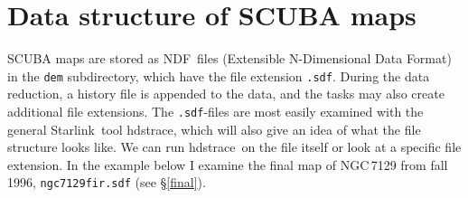 \documentclass[twoside,11pt]{article}
\newcommand{\starlink}{\htmladdnormallink{Starlink}{http://star-www.rl.ac.uk/}}
\newcommand{\ndf}{\xref{NDF}{sun33}{}}
\newcommand{\task}[1]{\textsf{#1}}
\newcommand{\hdstrace}{\xref{\task{hdstrace}}{sun102}{}}
\newcommand{\htmladdnormallink}[2]{#1}
\newcommand{\xref}[3]{#1}
\newcommand{\xlabel}[1]{}
\begin{document}
\section{\xlabel{data_structures_of_scuba_maps}Data structure of SCUBA maps}

SCUBA maps are stored as \ndf\ files (Extensible N-Dimensional Data Format)
\cite{ndf} in the \texttt{dem} subdirectory, which have the file extension
\texttt{.sdf}. During the data reduction, a history file is appended to the
data, and the tasks may also create additional file extensions. The
\texttt{.sdf}-files are most easily examined with the general \starlink\ tool
\hdstrace \cite{hdstrace}, which will also give an idea of what the file 
structure looks like. We can run \hdstrace\ on the file itself or look at
a specific file extension. In the example below I examine the final map of
NGC\,7129 from fall 1996, \texttt{ngc7129fir.sdf} (see \S\ref{final}).
\end{document}
